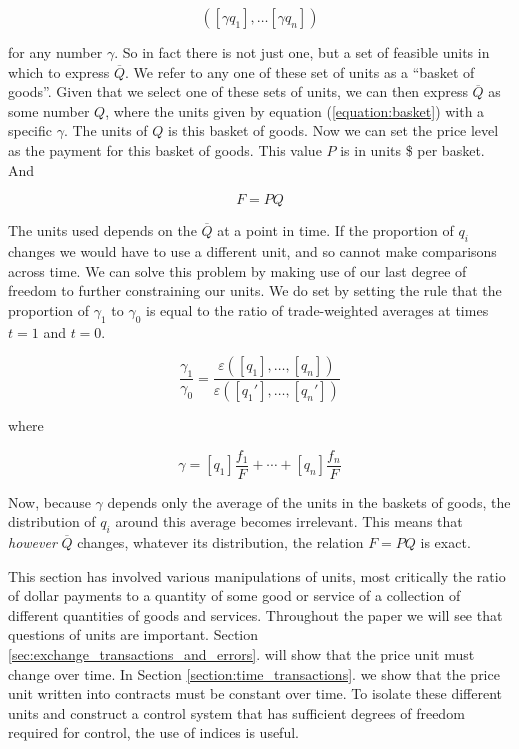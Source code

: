 \begin{equation}\label{equation:basket}
    \left( \left[ \gamma q_1 \right], \dots \left[ \gamma q_n \right] \right)
\end{equation}

for any number $\gamma$. So in fact there is not just one, but a set of feasible units in which to
express $\overline Q$. We refer to any one of these set of units as a ``basket of goods''. Given
that we select one of these sets of units, we can then express $\overline Q$ as some number $Q$,
where the units given by equation (\ref{equation:basket}) with a specific $\gamma$. The units of
$Q$ is this basket of goods. Now we can set the price level as the payment for this basket of goods.
This value $P$ is in units \$ per basket. And

\begin{equation} \label{eq:fpq}
   F = PQ
\end{equation}

The units used depends on the $\overline Q$ at a point in time. If the proportion of $q_i$ changes
we would have to use a different unit, and so cannot make comparisons across time. We can solve this
problem by making use of our last degree of freedom to further constraining our units. We do set by
setting the rule that the proportion of $\gamma_1$ to $\gamma_0$ is equal to the ratio of
trade-weighted averages at times $t=1$ and $t=0$. 

\begin{equation}
    \frac {\gamma_1} {\gamma_0} = \frac {\varepsilon \left( \left[ q_1 \right], \dots, \left[ q_n \right] \right)}
    {\varepsilon \left( \left[ {q_1}' \right], \dots, \left[ {q_n}' \right] \right)}
\end{equation}

where

\[ \gamma = [q_1] \frac {f_1} F + \cdots + [q_n] \frac {f_n} F \]

Now, because $\gamma$ depends only the average of the units in the baskets of goods, the distribution of
$q_i$ around this average becomes irrelevant. This means that \textit{however} $\overline Q$
changes, whatever its distribution, the relation $F=PQ$ is exact.  

This section has involved various manipulations of units, most critically the ratio of dollar
payments to a quantity of some good or service of a collection of different quantities of goods and
services. Throughout the paper we will see that questions of units are important. Section
\ref{sec:exchange_transactions_and_errors}. will show that the price unit must change over
time. In Section \ref{section:time_transactions}. we show that the price unit written into
contracts must be constant over time. To isolate these different units and construct a control
system that has sufficient degrees of freedom required for control, the use of indices is useful.

